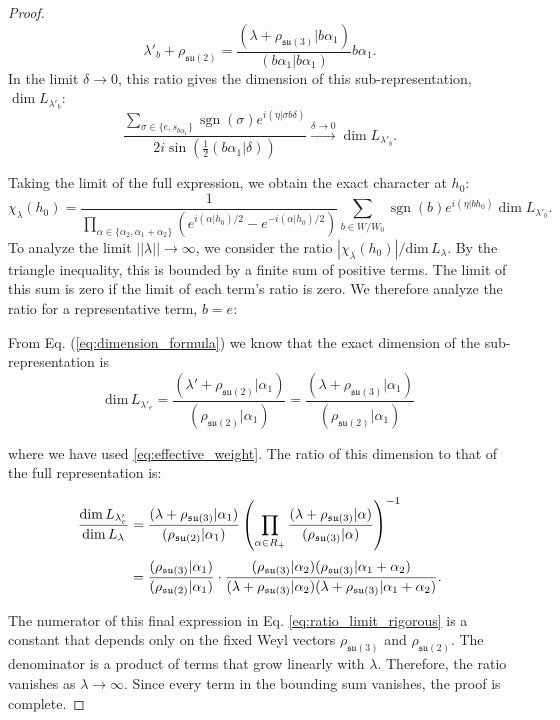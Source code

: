 \documentclass[10pt,a4paper]{amsart}
\DeclareMathOperator{\sgn}{sgn}
\newcommand{\dimL}{\mathrm{dim}\,L_\lambda}
\newcommand{\su}{\mathfrak{su}}
\begin{document}
\begin{proof}
\begin{equation}
    \label{eq:effective_weight}
    \lambda'_{b} + \rho_{\su(2)} = \frac{(\lambda + \rho_{\su(3)}|b\alpha_1)}{(b\alpha_1|b\alpha_1)} b\alpha_1.
\end{equation}
 In the limit $\delta \to 0$, this ratio gives the dimension of this sub-representation, $\dim L_{\lambda'_{b}}$:
\begin{equation}
    \frac{\sum_{\sigma \in \{e, s_{b\alpha_1}\}} \sgn(\sigma) e^{i(\eta|\sigma b\delta)}}{2i\sin\left(\frac{1}{2}(b\alpha_1|\delta)\right)} \xrightarrow{\delta \to 0} \dim L_{\lambda'_{b}}.
\end{equation}

Taking the limit of the full expression, we obtain the exact character at $h_0$:
\begin{equation}
    \chi_\lambda(h_0) = \frac{1}{\prod_{\alpha \in \{\alpha_2, \alpha_1+\alpha_2\}} \left(e^{i(\alpha|h_0)/2} - e^{-i(\alpha|h_0)/2}\right)} \sum_{b \in W/W_0} \sgn(b) e^{i(\eta|b h_0)} \dim L_{\lambda'_{b}}.
\end{equation}
To analyze the limit $||\lambda|| \to \infty$, we consider the ratio $|\chi_\lambda(h_0)|/\dimL$. By the triangle inequality, this is bounded by a finite sum of positive terms. The limit of this sum is zero if the limit of each term's ratio is zero. We therefore analyze the ratio for a representative term, $b=e$:

From Eq. (\ref{eq:dimension_formula}) we know that the exact dimension of the sub-representation is 
\begin{equation}
    \mathrm{dim}\,L_{\lambda'_{e}} = \frac{(\lambda' + \rho_{\su(2)}|\alpha_1)}{(\rho_{\su(2)}|\alpha_1)}= \frac{(\lambda + \rho_{\su(3)}|\alpha_1)}{(\rho_{\su(2)}|\alpha_1)}
\end{equation}

where we have used \ref{eq:effective_weight}. The ratio of this dimension to that of the full representation is:

\begin{align}
    \frac{\mathrm{dim}\,L_{\lambda'_{e}}}{\mathrm{dim}\,L_\lambda} 
    &= \frac{(\lambda + \rho_{\su(3)}|\alpha_1)}{(\rho_{\su(2)}|\alpha_1)} \left( \prod_{\alpha \in R_+} \frac{(\lambda+\rho_{\su(3)}|\alpha)}{(\rho_{\su(3)}|\alpha)} \right)^{-1} \nonumber \\[\jot]
    &= \frac{(\rho_{\su(3)}|\alpha_1)}{(\rho_{\su(2)}|\alpha_1)} \cdot \frac{(\rho_{\su(3)}|\alpha_2)(\rho_{\su(3)}|\alpha_1+\alpha_2)}{(\lambda+\rho_{\su(3)}|\alpha_2)(\lambda+\rho_{\su(3)}|\alpha_1+\alpha_2)}. \label{eq:ratio_limit_rigorous}
\end{align}

The numerator of this final expression in Eq. \eqref{eq:ratio_limit_rigorous} is a constant that depends only on the fixed Weyl 
vectors $\rho_{\su(3)}$ and $\rho_{\su(2)}$. The denominator is a product of terms that grow linearly with $\lambda$. 
Therefore, the ratio vanishes as $\lambda \to \infty$. Since every term in the bounding sum 
vanishes, the proof is complete.

\end{proof}
\end{document}
